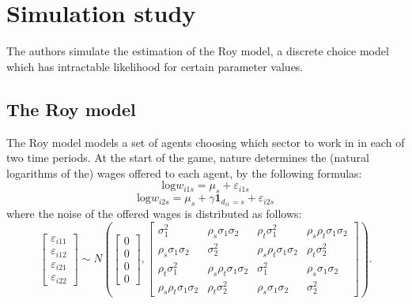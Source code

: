 \section{Simulation study}
\label{sec:simulation}

The authors simulate the estimation of the Roy model, a discrete choice model which has intractable likelihood for certain parameter values.

\subsection{The Roy model}
\label{sec:roy}

The Roy model models a set of agents choosing which sector to work in in each of two time periods.
At the start of the game, nature determines the (natural logarithms of the) wages offered to each agent, by the following formulas:
\begin{equation} %
    \text{log} w_{i1s} = \mu_s + \varepsilon_{i1s}
\end{equation}
\begin{equation}
    \text{log} w_{i2s} = \mu_s + \gamma \mathbf{1}_{d_{i1} = s} + \varepsilon_{i2s}
\end{equation}
where the noise of the offered wages is distributed as follows:
\begin{equation}
    \left[\begin{array}{l}\varepsilon_{i 11} \\ \varepsilon_{i 12} \\ \varepsilon_{i 21} \\ \varepsilon_{i 22}\end{array}\right] \sim N\left(\left[\begin{array}{l}0 \\ 0 \\ 0 \\ 0\end{array}\right],\left[\begin{array}{cccc}\sigma_1^2 & \rho_s \sigma_1 \sigma_2 & \rho_t \sigma_1^2 & \rho_s \rho_t \sigma_1 \sigma_2 \\ \rho_s \sigma_1 \sigma_2 & \sigma_2^2 & \rho_s \rho_t \sigma_1 \sigma_2 & \rho_t \sigma_2^2 \\ \rho_t \sigma_1^2 & \rho_s \rho_t \sigma_1 \sigma_2 & \sigma_1^2 & \rho_s \sigma_1 \sigma_2 \\ \rho_s \rho_t \sigma_1 \sigma_2 & \rho_t \sigma_2^2 & \rho_s \sigma_1 \sigma_2 & \sigma_2^2\end{array}\right]\right).
\end{equation}

